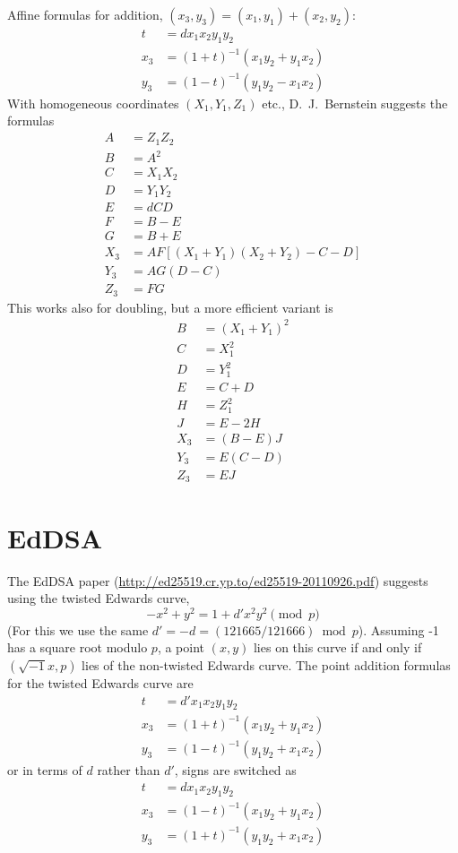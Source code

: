 \documentclass[a4paper]{article}
\begin{document}
Affine formulas for addition, $(x_3, y_3) = (x_1, y_1) + (x_2,
y_2)$:
\begin{align*}
  t &= d x_1 x_2 y_1 y_2 \\
  x_3 &= (1 + t)^{-1} (x_1 y_2 + y_1 x_2) \\
  y_3 &= (1 - t)^{-1} (y_1 y_2 - x_1 x_2)
\end{align*}
With homogeneous coordinates $(X_1, Y_1, Z_1)$ etc., D.~J.~Bernstein
suggests the formulas
\begin{align*}
  A &= Z_1 Z_2 \\
  B &= A^2 \\
  C &= X_1 X_2 \\
  D &= Y_1 Y_2 \\
  E &= d C D \\
  F &= B - E \\
  G &= B + E \\
  X_3 &= A F [(X_1 + Y_1)(X_2 + Y_2) - C - D] \\
  Y_3 &= A G (D - C) \\
  Z_3 &= F G
\end{align*}
This works also for doubling, but a more efficient variant is
\begin{align*}
  B &= (X_1 + Y_1)^2 \\
  C &= X_1^2 \\
  D &= Y_1^2 \\
  E &= C + D \\
  H &= Z_1^2 \\
  J &= E - 2H \\
  X_3 &= (B - E) J \\
  Y_3 &= E (C - D) \\
  Z_3 &= E J
\end{align*}

\section{EdDSA}

The EdDSA paper (\url{http://ed25519.cr.yp.to/ed25519-20110926.pdf})
suggests using the twisted Edwards curve,
\begin{equation*}
  -x^2 + y^2 = 1 + d' x^2 y^2 \pmod{p}
\end{equation*}
(For this we use the same $d' = -d = (121665/121666) \bmod p$).
Assuming -1 has a square root modulo $p$, a point $(x, y)$ lies on
this curve if and only if $(\sqrt{-1} x, p)$ lies of the non-twisted
Edwards curve. The point addition formulas for the twisted Edwards
curve are
\begin{align*}
  t &= d' x_1 x_2 y_1 y_2 \\
  x_3 &= (1 + t)^{-1} (x_1 y_2 + y_1 x_2) \\
  y_3 &= (1 - t)^{-1} (y_1 y_2 + x_1 x_2)
\end{align*}
or in terms of $d$ rather than $d'$, signs are switched as
\begin{align*}
  t &= d x_1 x_2 y_1 y_2 \\
  x_3 &= (1 - t)^{-1} (x_1 y_2 + y_1 x_2) \\
  y_3 &= (1 + t)^{-1} (y_1 y_2 + x_1 x_2)
\end{align*}
\end{document}
